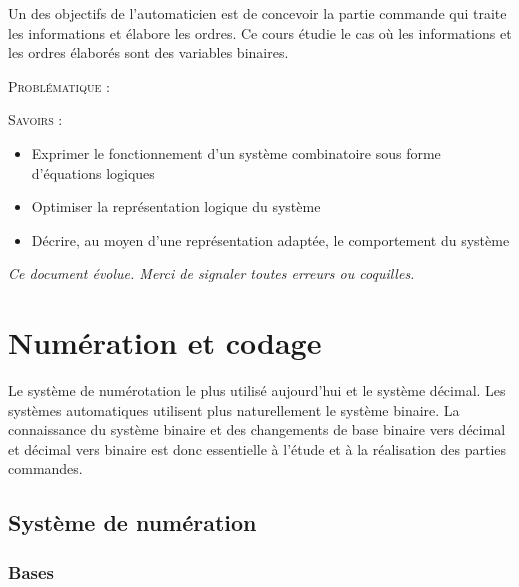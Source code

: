 \documentclass[11pt,oneside]{article}
\begin{document}
Un des objectifs de l'automaticien est de concevoir la partie commande qui traite les informations et élabore les ordres. Ce cours étudie le cas où les informations et les ordres élaborés sont des variables binaires.
\begin{prob}
\textsc{Problématique :}

\end{prob}

\begin{savoir}
\textsc{Savoirs :}
\begin{itemize}
\item Exprimer le fonctionnement d'un système combinatoire sous forme d'équations logiques
\item Optimiser la représentation logique du système
\item Décrire, au moyen d'une représentation adaptée, le comportement du système
\end{itemize}
\end{savoir}


\setlength{\parskip}{0ex plus 0.2ex minus 0ex}
 \renewcommand{\contentsname}{}
 \renewcommand{\baselinestretch}{1}

\tableofcontents

 \renewcommand{\baselinestretch}{1.2}
\setlength{\parskip}{2ex plus 0.5ex minus 0.2ex}

\textit{Ce document évolue. Merci de signaler toutes erreurs ou coquilles.}




\section{Numération et codage}
Le système de numérotation le plus utilisé aujourd'hui et le système décimal. Les systèmes automatiques utilisent plus naturellement le système binaire. La connaissance du système binaire et des changements de base binaire vers décimal et décimal vers binaire est donc essentielle à l'étude et à la réalisation des parties commandes.

\subsection{Système de numération}
\subsubsection{Bases}
\end{document}
